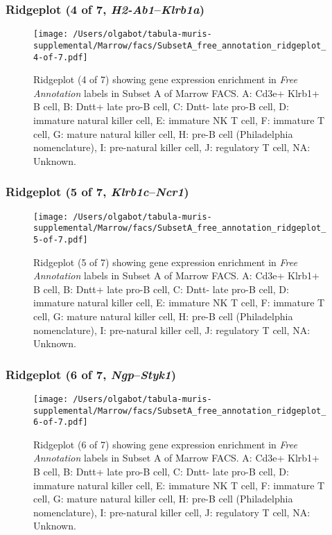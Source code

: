 \clearpage

\subsubsection{Ridgeplot (4 of 7, \emph{H2-Ab1}--\emph{Klrb1a})}
\begin{figure}[h]
\centering
\texttt{[image: /Users/olgabot/tabula-muris-supplemental/Marrow/facs/SubsetA\_free\_annotation\_ridgeplot\_4-of-7.pdf]}

\caption{ Ridgeplot (4 of 7)  showing gene expression enrichment in \emph{Free Annotation} labels in Subset A of Marrow FACS. A: Cd3e+ Klrb1+ B cell, B: Dntt+ late pro-B cell, C: Dntt- late pro-B cell, D: immature natural killer cell, E: immature NK T cell, F: immature T cell, G: mature natural killer cell, H: pre-B cell (Philadelphia nomenclature), I: pre-natural killer cell, J: regulatory T cell, NA: Unknown.}
\end{figure}


\clearpage

\subsubsection{Ridgeplot (5 of 7, \emph{Klrb1c}--\emph{Ncr1})}
\begin{figure}[h]
\centering
\texttt{[image: /Users/olgabot/tabula-muris-supplemental/Marrow/facs/SubsetA\_free\_annotation\_ridgeplot\_5-of-7.pdf]}

\caption{ Ridgeplot (5 of 7)  showing gene expression enrichment in \emph{Free Annotation} labels in Subset A of Marrow FACS. A: Cd3e+ Klrb1+ B cell, B: Dntt+ late pro-B cell, C: Dntt- late pro-B cell, D: immature natural killer cell, E: immature NK T cell, F: immature T cell, G: mature natural killer cell, H: pre-B cell (Philadelphia nomenclature), I: pre-natural killer cell, J: regulatory T cell, NA: Unknown.}
\end{figure}


\clearpage

\subsubsection{Ridgeplot (6 of 7, \emph{Ngp}--\emph{Styk1})}
\begin{figure}[h]
\centering
\texttt{[image: /Users/olgabot/tabula-muris-supplemental/Marrow/facs/SubsetA\_free\_annotation\_ridgeplot\_6-of-7.pdf]}

\caption{ Ridgeplot (6 of 7)  showing gene expression enrichment in \emph{Free Annotation} labels in Subset A of Marrow FACS. A: Cd3e+ Klrb1+ B cell, B: Dntt+ late pro-B cell, C: Dntt- late pro-B cell, D: immature natural killer cell, E: immature NK T cell, F: immature T cell, G: mature natural killer cell, H: pre-B cell (Philadelphia nomenclature), I: pre-natural killer cell, J: regulatory T cell, NA: Unknown.}
\end{figure}


